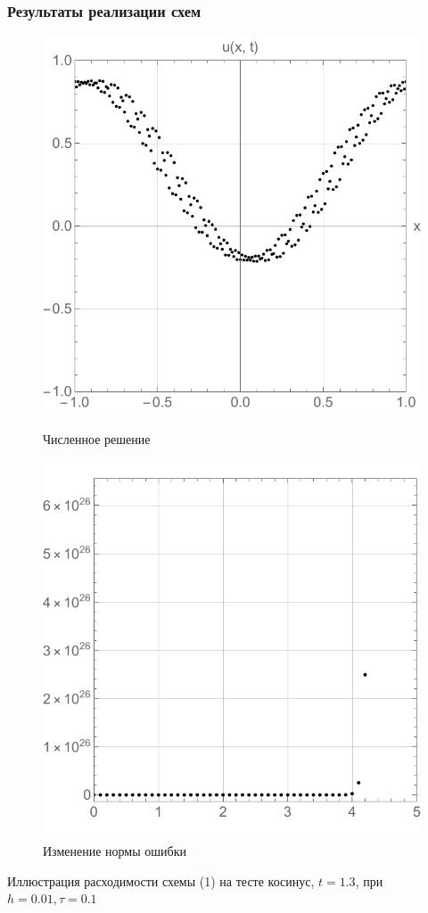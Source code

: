 \documentclass{beamer}
\begin{document}
\begin{frame}
	\frametitle{Результаты реализации схем}
	\begin{figure}
		\centering
		\begin{minipage}{0.45\textwidth}
			\centering
			\includegraphics[width=\textwidth]{res2_2}
			\caption{Численное решение}
			\label{fig:first}
		\end{minipage}\hfill
		\begin{minipage}{0.45\textwidth}
			\centering
			\includegraphics[width=\textwidth]{res2_3}
			\caption{Изменение нормы ошибки}
			\label{fig:second}
		\end{minipage}
	\end{figure}
	\centering Иллюстрация расходимости схемы (1) на тесте косинус, $t = 1.3$, при $h = 0.01, \tau = 0.1$
\end{frame}
\end{document}
